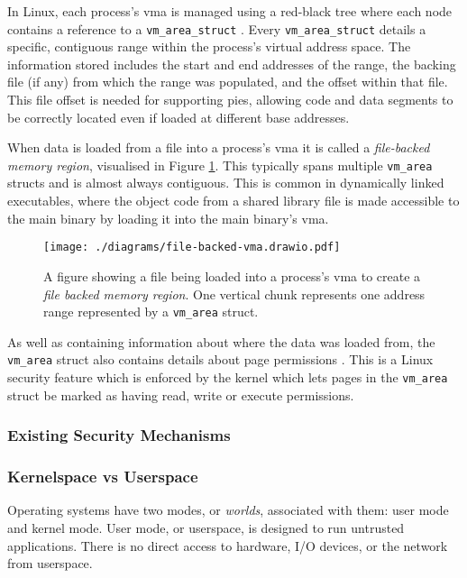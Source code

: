 In Linux, each process's \ac{vma} is managed using a
red-black tree where each node contains a reference to a
\texttt{vm\_area\_struct} . Every \texttt{vm\_area\_struct} details a specific, contiguous
range within the process's virtual address space. The information stored
includes the start and end addresses of the range, the backing file (if any)
from which the range was populated, and the offset within that file. This file
offset is needed for supporting \acp{pie}, allowing code and data segments to be correctly located even if loaded at different base addresses.

When data is loaded from a file into a process's \ac{vma} it is called a
\textit{file-backed memory region}, visualised in Figure
\ref{fig:file-backed-vma}. This typically spans multiple
\texttt{vm\_area} structs and is almost always contiguous. This is common in dynamically
linked executables, where the object code from a shared library file is made
accessible to the main binary by loading it into the main binary's \ac{vma}. 

\begin{figure}[ht]
    \centering
    \texttt{[image: ./diagrams/file-backed-vma.drawio.pdf]} 
    \caption{A figure showing a file being loaded into a process's \ac{vma} to
    create a \textit{file backed memory region}. One vertical chunk represents
one address range represented by a \texttt{vm\_area} struct.}
    \label{fig:file-backed-vma}
\end{figure}

As well as containing information about where the data was loaded from, the
\texttt{vm\_area} struct also contains details about page permissions . This is a Linux security feature which is enforced by the
kernel which lets pages in the \texttt{vm\_area} struct be marked as having read,
write or execute permissions.

\subsubsection{Existing Security Mechanisms}

\subsubsection{Kernelspace vs Userspace}
Operating systems have two modes, or \textit{worlds}, associated with them: user
mode and kernel mode. User mode, or userspace, is designed to run untrusted 
applications. There is no direct access to hardware, I/O devices, or the 
network from userspace.

